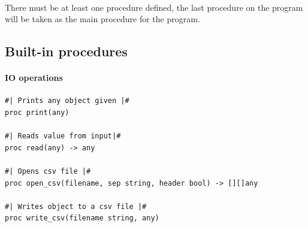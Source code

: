 \documentclass[12pt, titlepage]{article}
\begin{document}
\paragraph{} There must be at least one procedure defined, the last procedure
on the program will be taken as the main procedure for the program.

\subsection{Built-in procedures}
\paragraph{IO operations}
\begin{verbatim}
#| Prints any object given |#
proc print(any)

#| Reads value from input|#
proc read(any) -> any

#| Opens csv file |#
proc open_csv(filename, sep string, header bool) -> [][]any

#| Writes object to a csv file |#
proc write_csv(filename string, any)
\end{verbatim}
\end{document}
